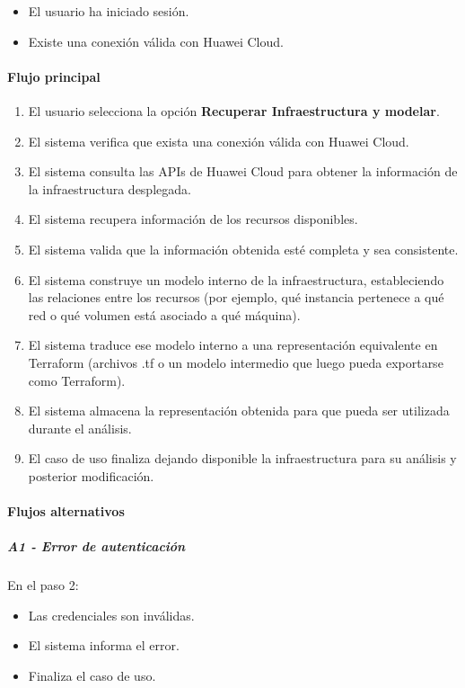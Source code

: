 \begin{itemize}
\item El usuario ha iniciado sesión.
\item Existe una conexión válida con Huawei Cloud.
\end{itemize}

\paragraph*{Flujo principal}

\begin{enumerate}
\item El usuario selecciona la opción \textbf{Recuperar Infraestructura y modelar}.
\item El sistema verifica que exista una conexión válida con Huawei Cloud.
\item El sistema consulta las APIs de Huawei Cloud para obtener la información de la infraestructura desplegada.
\item El sistema recupera información de los recursos disponibles.
\item El sistema valida que la información obtenida esté completa y sea consistente.
\item El sistema construye un modelo interno de la infraestructura, estableciendo las relaciones entre los recursos (por ejemplo, qué instancia pertenece a qué red o qué volumen está asociado a qué máquina).
\item El sistema traduce ese modelo interno a una representación equivalente en Terraform (archivos .tf o un modelo intermedio que luego pueda exportarse como Terraform).
\item El sistema almacena la representación obtenida para que pueda ser utilizada durante el análisis.
\item El caso de uso finaliza dejando disponible la infraestructura para su análisis y posterior modificación.
\end{enumerate}

\paragraph*{Flujos alternativos}

\subparagraph{A1 - Error de autenticación}

En el paso 2:

\begin{itemize}
\item Las credenciales son inválidas.
\item El sistema informa el error.
\item Finaliza el caso de uso.
\end{itemize}

